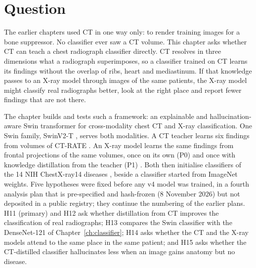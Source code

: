 \section{Question}
\label{sec:xm_intro}
The earlier chapters used CT in one way only: to render training images for a bone suppressor. No classifier ever saw a CT volume. This
chapter asks whether CT can teach a chest radiograph classifier directly. CT resolves in three dimensions what a radiograph superimposes,
so a classifier trained on CT learns its findings without the overlap of ribs, heart and mediastinum. If that knowledge passes to an X-ray
model through images of the same patients, the X-ray model might classify real radiographs better, look at the right place and report
fewer findings that are not there.

The chapter builds and tests such a framework: an explainable and hallucination-aware Swin transformer for cross-modality chest CT and
X-ray classification. One Swin family, SwinV2-T \citep{liu2022swinv2}, serves both modalities. A CT teacher learns six findings from
volumes of CT-RATE \citep{hamamci2026ctrate}. An X-ray model learns the same findings from frontal projections of the same volumes, once on
its own (P0) and once with knowledge distillation from the teacher (P1) \citep{hinton2015distilling}. Both then initialise classifiers of
the 14 NIH ChestX-ray14 diseases \citep{wang2017chestxray}, beside a classifier started from ImageNet weights. Five hypotheses were fixed
before any v4 model was trained, in a fourth analysis plan that is pre-specified and hash-frozen (8 November 2026) but not deposited in a
public registry; they continue the numbering of the earlier plans. H11 (primary) and H12 ask whether distillation from CT improves the
classification of real radiographs; H13 compares the Swin classifier with the DenseNet-121 of Chapter~\ref{ch:classifier}; H14 asks
whether the CT and the X-ray models attend to the same place in the same patient; and H15 asks whether the CT-distilled classifier
hallucinates less when an image gains anatomy but no disease.

